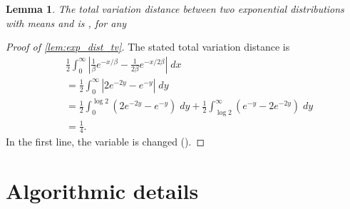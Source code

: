 \documentclass[ejs,noshowframe]{imsart}
\theoremstyle{plain}
\newtheorem{lemma}[theorem]{Lemma}
\theoremstyle{definition}
\begin{document}
\begin{appendix}
\begin{lemma}
\label{lem:exp_dist_tv}
The total variation distance between two exponential distributions with means 
\smash{$\beta$} and \smash{$2\beta$} is , for any 
\end{lemma}
\begin{proof}[Proof of \autoref{lem:exp_dist_tv}]
The stated total variation distance is 
\begin{align*}
& \frac{1}{2}\int_0^\infty \left| \frac{1}{\beta} e^{-x/\beta} - 
\frac{1}{2\beta} e^{-x/2\beta} \right| \; dx \\
	&= \frac{1}{2} \int_0^\infty | 2 e^{-2y} - e^{-y} | \; dy\\
	&= \frac{1}{2}\int_0^{\log 2} (2e^{-2y} - e^{-y}) \; dy 
			+ \frac{1}{2}\int_{\log 2}^\infty (e^{-y} - 2e^{-2y} ) 
\; dy\\
	&= \frac{1}{4}.
\end{align*}
In the first line, the variable is changed ().
\end{proof}


\section{Algorithmic details}
\label{sec:app-algor-deets}



\end{appendix}
\end{document}
